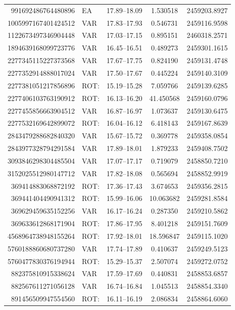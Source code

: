 \documentclass[11pt]{article}
\begin{document}
{\begin{longtable}{rlccc}
991692486764480896 & EA & 17.89--18.09 & 1.530518 & 2459203.8927 \\
1005997167401424512 & VAR & 17.83--17.93 & 0.546731 & 2459116.9598 \\
1122673497346904448 & VAR & 17.03--17.15 & 0.895151 & 2460318.2571 \\
1894639168099723776 & VAR & 16.45--16.51 & 0.489273 & 2459301.1615 \\
2277345115227373568 & VAR & 17.67--17.75 & 0.824190 & 2459131.4748 \\
2277352914888017024 & VAR & 17.50--17.67 & 0.445224 & 2459140.3109 \\
2277381051217856896 & ROT: & 15.19--15.28 & 7.059766 & 2459139.6285 \\
2277406103763190912 & ROT: & 16.13--16.20 & 41.450568 & 2459160.0796 \\
2277455856663904512 & VAR & 16.87--16.97 & 1.073637 & 2459130.6475 \\
2277532169642899072 & ROT: & 16.04--16.12 & 6.418143 & 2459167.8639 \\
2843479288682840320 & VAR & 15.67--15.72 & 0.369778 & 2459358.0854 \\
2843977328794291584 & VAR & 17.89--18.01 & 1.879233 & 2459408.7502 \\
3093846298304485504 & VAR & 17.07--17.17 & 0.719079 & 2458850.7210 \\
3152025512980147712 & VAR & 17.82--18.08 & 0.565694 & 2458852.9919 \\
369414883068872192 & ROT: & 17.36--17.43 & 3.674653 & 2459356.2815 \\
369441404490941312 & ROT: & 15.99--16.06 & 10.063682 & 2459281.8584 \\
369629459635152256 & VAR & 16.17--16.24 & 0.287350 & 2459210.5862 \\
369633612868171904 & ROT: & 17.86--17.95 & 8.401218 & 2459151.7609 \\
4568964738948155264 & ROT: & 17.92--18.01 & 18.596847 & 2459115.1020 \\
5760188860680737280 & VAR & 17.74--17.89 & 0.410637 & 2459249.5123 \\
5760477830376194944 & ROT: & 15.29--15.37 & 2.507074 & 2459272.0752 \\
882375810915338624 & VAR & 17.59--17.69 & 0.440831 & 2458853.6857 \\
882567611271056128 & VAR & 16.74--16.84 & 1.045513 & 2458854.3340 \\
891456509947554560 & ROT: & 16.11--16.19 & 2.086834 & 2458864.6060 \\

\end{longtable}}
\end{document}
